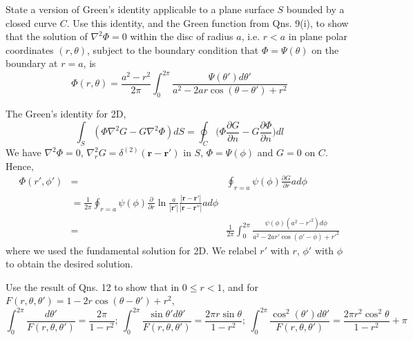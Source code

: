 \documentclass[a4paper]{article}
\begin{document}
\newpage
\begin{qns}
State a version of Green's identity applicable to a plane surface $S$ bounded by a closed curve $C$. Use this identity, and the Green function from Qns. 9(i), to show that the solution of $\nabla^2\Phi=0$ within the disc of radius $a$, i.e. $r < a$ in plane polar coordinates $(r,\theta)$, subject to the boundary condition that $\Phi=\Psi(\theta)$ on the boundary at $r = a$, is
$$\Phi(r,\theta)=\frac{a^2-r^2}{2\pi}\int_0^{2\pi}\frac{\Psi(\theta')d\theta'}{a^2-2ar\cos(\theta-\theta')+r^2}$$
\end{qns}
\begin{ans}
The Green's identity for 2D,
$$\int_S(\Phi\nabla^2G-G\nabla^2\Phi)dS=\oint_C\bigg(\Phi\frac{\partial G}{\partial n}-G\frac{\partial\Phi}{\partial n}\bigg)dl$$
We have $\nabla^2\Phi=0$, $\nabla_r^2G=\delta^{(2)}(\mathbf{r}-\mathbf{r'})$ in $S$, $\Phi=\Psi(\phi)$ and $G=0$ on $C$. Hence,
\begin{eqnarray}
\Phi(r',\phi')&=&\oint_{r=a}\psi(\phi)\frac{\partial G}{\partial r}ad\phi\nonumber\\&=\frac{1}{2\pi}\oint_{r=a}\psi(\phi)\frac{\partial}{\partial r}\ln\frac{a}{|\mathbf{r'}|}\frac{|\mathbf{r}-\mathbf{r'}|}{|\mathbf{r}-\mathbf{r''}|}ad\phi\nonumber\\&=&\frac{1}{2\pi}\int_0^{2\pi}\frac{\psi(\phi)(a^2-r'^2)d\phi}{a^2-2ar'\cos(\phi'-\phi)+r'^2}\nonumber
\end{eqnarray}
where we used the fundamental solution for 2D. We relabel $r'$ with $r$, $\phi'$ with $\phi$ to obtain the desired solution.
\end{ans}
\begin{qns}
Use the result of Qns. 12 to show that in $0\leq r<1$, and for $F(r,\theta,\theta')=1-2r\cos(\theta-\theta')+r^2$,
$$\int_0^{2\pi}\frac{d\theta'}{F(r,\theta,\theta')}=\frac{2\pi}{1-r^2};~\int_0^{2\pi}\frac{\sin\theta'd\theta'}{F(r,\theta,\theta')}=\frac{2\pi r\sin\theta}{1-r^2};~\int_0^{2\pi}\frac{\cos^2(\theta')d\theta'}{F(r,\theta,\theta')}=\frac{2\pi r^2\cos^2\theta}{1-r^2}+\pi$$
\end{qns}
\end{document}

